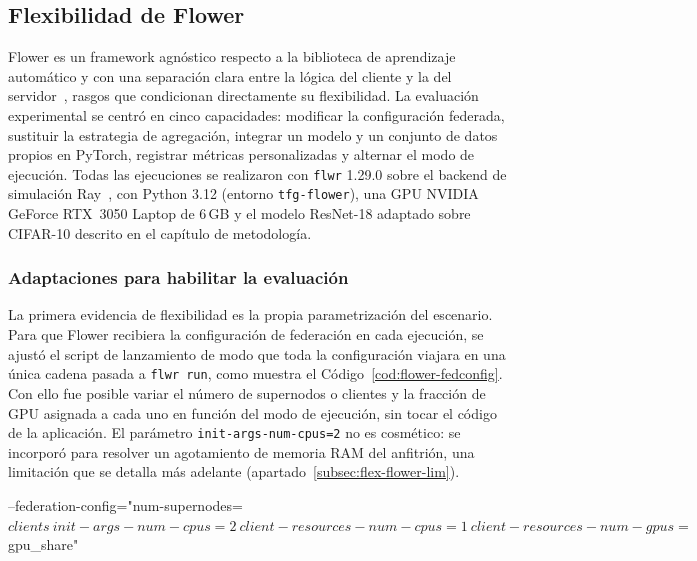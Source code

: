 \subsection{Flexibilidad de Flower}\label{sec:flex-flower}

Flower es un framework agnóstico respecto a la biblioteca de aprendizaje
automático y con una separación clara entre la lógica del cliente y la del
servidor~\parencite{beutel2020flower}, rasgos que condicionan directamente su
flexibilidad. La evaluación experimental se centró en cinco capacidades: modificar
la configuración federada, sustituir la estrategia de agregación, integrar un
modelo y un conjunto de datos propios en PyTorch, registrar métricas personalizadas
y alternar el modo de ejecución. Todas las ejecuciones se realizaron con
\texttt{flwr} 1.29.0 sobre el backend de simulación Ray~\parencite{moritz2018ray},
con Python 3.12 (entorno \texttt{tfg-flower}), una GPU NVIDIA GeForce RTX~3050
Laptop de 6\,GB y el modelo ResNet-18 adaptado sobre CIFAR-10 descrito en el
capítulo de metodología.

\subsubsection{Adaptaciones para habilitar la evaluación}\label{subsec:flex-flower-adapt}

La primera evidencia de flexibilidad es la propia parametrización del escenario.
Para que Flower recibiera la configuración de federación en cada ejecución, se
ajustó el script de lanzamiento de modo que toda la configuración viajara en una
única cadena pasada a \texttt{flwr run}, como muestra el Código~\ref{cod:flower-fedconfig}.
Con ello fue posible variar el número de supernodos o clientes y la fracción de
GPU asignada a cada uno en función del modo de ejecución, sin tocar el código de
la aplicación. El parámetro \texttt{init-args-num-cpus=2} no es cosmético: se
incorporó para resolver un agotamiento de memoria RAM del anfitrión, una
limitación que se detalla más adelante (apartado~\ref{subsec:flex-flower-lim}).

\begin{bashcode}[title={run\_flower\_experiments.sh}, label={cod:flower-fedconfig}, list entry={\protect\numberline{\thelisting}Configuración de la federación en Flower (run\_flower\_experiments.sh)}]
--federation-config="num-supernodes=$clients \
  init-args-num-cpus=2 \
  client-resources-num-cpus=1 \
  client-resources-num-gpus=$gpu_share"
\end{bashcode}

